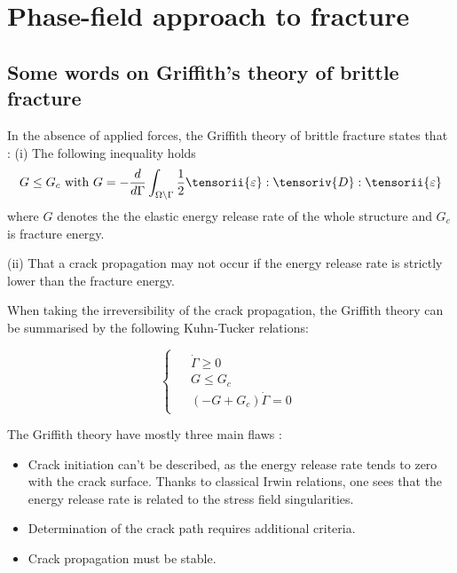 \section{Phase-field approach to fracture}

\subsection{Some words on Griffith's theory of brittle fracture}

In the absence of applied forces, the Griffith theory of brittle
fracture states that \cite{francfort_revisiting_1998}:
(i) The following inequality holds
\begin{equation}
    \begin{aligned}
        G \leq G_{c}
        \mbox{ with }
        G = -\frac{d}{d\Gamma} \int_{\Omega \backslash \Gamma} \frac{1}{2} \tensorii{\varepsilon} : \tensoriv{D} : \tensorii{\varepsilon}
    \end{aligned}
\end{equation}
where $G$ denotes the the elastic energy release rate of the whole structure and $G_c$ is fracture energy.

(ii) That a crack propagation may not occur if the energy release rate is
strictly lower than the fracture energy.

When taking the irreversibility of the crack propagation, the Griffith
theory can be summarised by the following Kuhn-Tucker relations:

\begin{equation}
    \begin{cases}
        \begin{aligned}
            & \dot{\Gamma} \geq 0
            \\
            & G \leq G_{c}
            \\
            & (-G+G_c)\dot{\Gamma} = 0
        \end{aligned}
    \end{cases}
\end{equation}

The Griffith theory have mostly three main flaws \cite{francfort_vers_2002}:
\begin{itemize}
    \item Crack initiation can't be described, as the energy release rate tends
    to zero with the crack surface. Thanks to classical Irwin relations,
    one sees that the energy release rate is related to the stress field
    singularities.
    \item Determination of the crack path requires additional criteria.
    \item Crack propagation must be stable.
\end{itemize}

